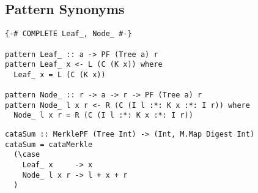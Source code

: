 \subsection{Pattern Synonyms}
\begin{verbatim}
{-# COMPLETE Leaf_, Node_ #-}

pattern Leaf_ :: a -> PF (Tree a) r
pattern Leaf_ x <- L (C (K x)) where
  Leaf_ x = L (C (K x))

pattern Node_ :: r -> a -> r -> PF (Tree a) r
pattern Node_ l x r <- R (C (I l :*: K x :*: I r)) where
  Node_ l x r = R (C (I l :*: K x :*: I r))
\end{verbatim}

\begin{verbatim}
cataSum :: MerklePF (Tree Int) -> (Int, M.Map Digest Int)
cataSum = cataMerkle
  (\case
    Leaf_ x     -> x
    Node_ l x r -> l + x + r
  )
\end{verbatim}